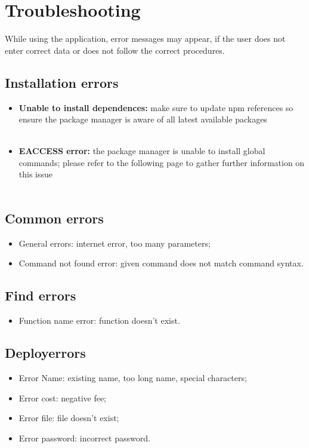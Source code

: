 \section{Troubleshooting}
While using the application, error messages may appear, if the user does not enter correct data or does not follow the correct procedures.
\subsection{Installation errors}
\begin{itemize}
	\item \textbf{Unable to install dependences:} make sure to update npm references so ensure the package manager is aware of all latest available packages\\\\ \centerline{}
	\item \textbf{EACCESS error:} the package manager is unable to install global commands; please refer to the following page to gather further information on this issue\\\\\centerline{}
\end{itemize}
\subsection{Common errors}
\begin{itemize}
	\item General errors: internet error, too many parameters;
	\item Command not found error: given command does not match command syntax.
\end{itemize}
\subsection{Find errors}
\begin{itemize}
	\item Function name error: function doesn't exist.
\end{itemize}
\subsection{Deploy\glo errors}
\begin{itemize}
	\item Error Name: existing name, too long name, special characters;
	\item Error cost: negative fee;
	\item Error file: file doesn't exist;
	\item Error password: incorrect password.
\end{itemize}
